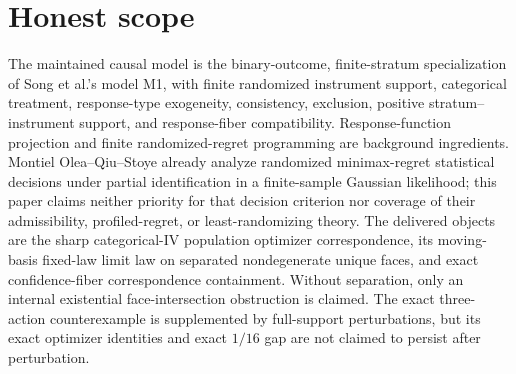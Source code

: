 \documentclass{article}
\begin{document}
\section{Honest scope}

The maintained causal model is the binary-outcome, finite-stratum specialization of Song et al.'s model M1, with finite randomized instrument support, categorical treatment, response-type exogeneity, consistency, exclusion, positive stratum--instrument support, and response-fiber compatibility.  Response-function projection and finite randomized-regret programming are background ingredients.  Montiel Olea--Qiu--Stoye already analyze randomized minimax-regret statistical decisions under partial identification in a finite-sample Gaussian likelihood; this paper claims neither priority for that decision criterion nor coverage of their admissibility, profiled-regret, or least-randomizing theory.  The delivered objects are the sharp categorical-IV population optimizer correspondence, its moving-basis fixed-law limit law on separated nondegenerate unique faces, and exact confidence-fiber correspondence containment.  Without separation, only an internal existential face-intersection obstruction is claimed.  The exact three-action counterexample is supplemented by full-support perturbations, but its exact optimizer identities and exact \(1/16\) gap are not claimed to persist after perturbation.
\end{document}
